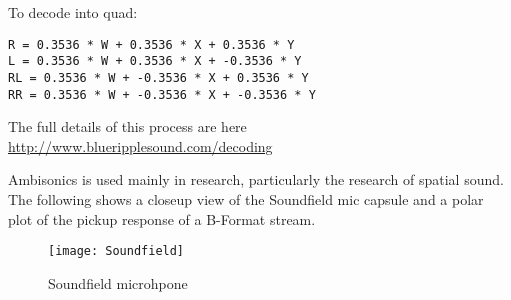 To decode into quad:
\begin{verbatim}
R = 0.3536 * W + 0.3536 * X + 0.3536 * Y
L = 0.3536 * W + 0.3536 * X + -0.3536 * Y
RL = 0.3536 * W + -0.3536 * X + 0.3536 * Y
RR = 0.3536 * W + -0.3536 * X + -0.3536 * Y
\end{verbatim}

The full details of this process are here \url{http://www.blueripplesound.com/decoding}


Ambisonics is used mainly in research, particularly the research of spatial sound. The following shows a closeup view of the Soundfield mic capsule and a polar plot of the pickup response of a B-Format stream.


\begin{figure}[H]
\centering
\texttt{[image: Soundfield]}\caption{Soundfield microhpone}
\label{fig:soundfield}
\end{figure}



\begin{comment}

\begin{figure}[H]
\centering
\texttt{[image: usssinputoutput]}\caption{ussstools input output and sfplay}
\label{fig:usssinputoutput}
\end{figure}

\end{comment}
